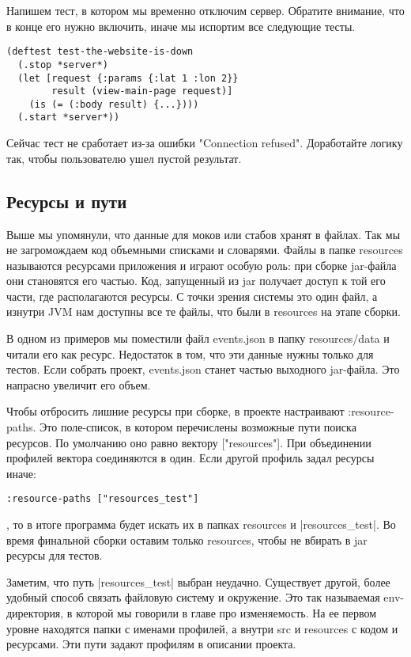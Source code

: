 Напишем тест, в котором мы временно отключим сервер. Обратите внимание, что в
конце его нужно включить, иначе мы испортим все следующие тесты.

\begin{verbatim}
(deftest test-the-website-is-down
  (.stop *server*)
  (let [request {:params {:lat 1 :lon 2}}
        result (view-main-page request)]
    (is (= (:body result) {...})))
  (.start *server*))
\end{verbatim}

Сейчас тест не сработает из-за ошибки "Connection refused". Доработайте логику
так, чтобы пользователю ушел пустой результат.

\subsection{Ресурсы и пути}

Выше мы упомянули, что данные для моков или стабов хранят в файлах. Так мы не
загромождаем код объемными списками и словарями. Файлы в папке resources
называются ресурсами приложения и играют особую роль: при сборке jar-файла они
становятся его частью. Код, запущенный из jar получает доступ к той его части,
где располагаются ресурсы. С точки зрения системы это один файл, а изнутри JVM
нам доступны все те файлы, что были в resources на этапе сборки.

В одном из примеров мы поместили файл events.json в папку resources/data и
читали его как ресурс. Недостаток в том, что эти данные нужны только для
тестов. Если собрать проект, events.json станет частью выходного jar-файла. Это
напрасно увеличит его объем.

Чтобы отбросить лишние ресурсы при сборке, в проекте настраивают
:resource-paths. Это поле-список, в котором перечислены возможные пути поиска
ресурсов. По умолчанию оно равно вектору ["resources"]. При объединении профилей
вектора соединяются в один. Если другой профиль задал ресурсы иначе:

\begin{verbatim}
:resource-paths ["resources_test"]
\end{verbatim}

, то в итоге программа будет искать их в папках resources и \spverb|resources_test|. Во
время финальной сборки оставим только resources, чтобы не вбирать в jar ресурсы
для тестов.

Заметим, что путь \spverb|resources_test| выбран неудачно. Существует другой, более
удобный способ связать файловую систему и окружение. Это так называемая
env-директория, в которой мы говорили в главе про изменяемость. На ее первом
уровне находятся папки с именами профилей, а внутри src и resources с кодом и
ресурсами. Эти пути задают профилям в описании проекта.

